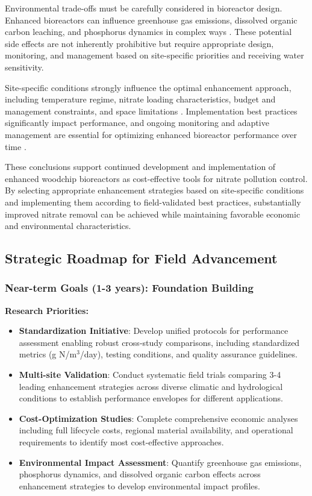 \documentclass[12pt,a4paper]{article}
\begin{document}
Environmental trade-offs must be carefully considered in bioreactor design. Enhanced bioreactors can influence greenhouse gas emissions, dissolved organic carbon leaching, and phosphorus dynamics in complex ways \citep{RN1181, RN291, RN370}. These potential side effects are not inherently prohibitive but require appropriate design, monitoring, and management based on site-specific priorities and receiving water sensitivity.

Site-specific conditions strongly influence the optimal enhancement approach, including temperature regime, nitrate loading characteristics, budget and management constraints, and space limitations \citep{RN310}. Implementation best practices significantly impact performance, and ongoing monitoring and adaptive management are essential for optimizing enhanced bioreactor performance over time \citep{RN310, RN312}.

These conclusions support continued development and implementation of enhanced woodchip bioreactors as cost-effective tools for nitrate pollution control. By selecting appropriate enhancement strategies based on site-specific conditions and implementing them according to field-validated best practices, substantially improved nitrate removal can be achieved while maintaining favorable economic and environmental characteristics.

\subsection{Strategic Roadmap for Field Advancement}

\subsubsection{Near-term Goals (1-3 years): Foundation Building}

\textbf{Research Priorities:}
\begin{itemize}
\item \textbf{Standardization Initiative}: Develop unified protocols for performance assessment enabling robust cross-study comparisons, including standardized metrics (g N/m$^3$/day), testing conditions, and quality assurance guidelines.
\item \textbf{Multi-site Validation}: Conduct systematic field trials comparing 3-4 leading enhancement strategies across diverse climatic and hydrological conditions to establish performance envelopes for different applications.
\item \textbf{Cost-Optimization Studies}: Complete comprehensive economic analyses including full lifecycle costs, regional material availability, and operational requirements to identify most cost-effective approaches.
\item \textbf{Environmental Impact Assessment}: Quantify greenhouse gas emissions, phosphorus dynamics, and dissolved organic carbon effects across enhancement strategies to develop environmental impact profiles.
\end{itemize}
\end{document}
